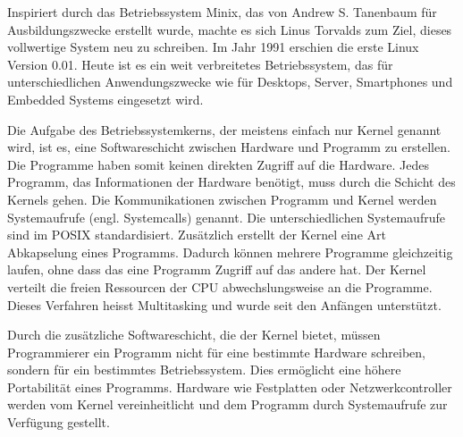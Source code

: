 Inspiriert durch das Betriebssystem Minix, das von Andrew S. Tanenbaum für Ausbildungszwecke erstellt wurde, machte es sich Linus Torvalds zum Ziel, dieses vollwertige System neu zu schreiben. Im Jahr 1991 erschien die erste Linux Version 0.01\cite{ehses2011systemprogrammierung_chap2}. Heute ist es ein weit verbreitetes Betriebssystem, das für unterschiedlichen Anwendungszwecke wie für Desktops, Server, Smartphones und Embedded Systems eingesetzt wird.
\par
Die Aufgabe des Betriebssystemkerns, der meistens einfach nur Kernel genannt wird, ist es, eine Softwareschicht zwischen Hardware und Programm zu erstellen. Die Programme haben somit keinen direkten Zugriff auf die Hardware. Jedes Programm, das Informationen der Hardware benötigt, muss durch die Schicht des Kernels gehen. Die Kommunikationen zwischen Programm und Kernel werden Systemaufrufe (engl. Systemcalls) genannt. Die unterschiedlichen Systemaufrufe sind im POSIX standardisiert\cite{ehses2011systemprogrammierung_chap2}. Zusätzlich erstellt der Kernel eine Art Abkapselung eines Programms. Dadurch können mehrere Programme gleichzeitig laufen, ohne dass das eine Programm Zugriff auf das andere hat. Der Kernel verteilt die freien Ressourcen der CPU abwechslungsweise an die Programme. Dieses Verfahren heisst Multitasking und wurde seit den Anfängen unterstützt.
\par
Durch die zusätzliche Softwareschicht, die der Kernel bietet, müssen Programmierer ein Programm nicht für eine bestimmte Hardware schreiben, sondern für ein bestimmtes Betriebssystem. Dies ermöglicht eine höhere Portabilität eines Programms. Hardware wie Festplatten oder Netzwerkcontroller werden vom Kernel vereinheitlicht und dem Programm durch Systemaufrufe zur Verfügung gestellt.
\par


